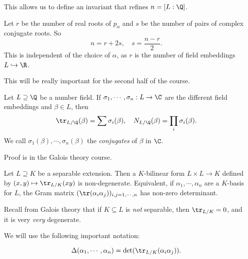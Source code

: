 \documentclass[a4paper]{article}
\begin{document}
This allows us to define an invariant that refines $n = [L:\Q]$.

\begin{defi}[$r$ and $s$]
  Let $r$ be the number of real roots of $p_\alpha$ and $s$ be the number of pairs of complex conjugate roots. So
  \[
    n = r + 2s,\quad s = \frac{n - r}{2}.
  \]
  This is independent of the choice of $\alpha$, as $r$ is the number of field embeddings $L \hookrightarrow \R$.
\end{defi}
This will be really important for the second half of the course.

\begin{cor}
  Let $L \supseteq \Q$ be a number field. If $\sigma_1, \cdots, \sigma_n:L \to \C$ are the different field embeddings and $\beta \in L$, then
  \[
    \tr_{L/\Q}(\beta) = \sum \sigma_i(\beta),\quad N_{L/\Q}(\beta) = \prod_i \sigma_i(\beta).
  \]
  We call $\sigma_1(\beta), \cdots, \sigma_n (\beta)$ the \emph{conjugates} of $\beta$ in $\C$.
\end{cor}
Proof is in the Galois theory course.

\begin{prop}
  Let $L\supseteq K$ be a separable extension. Then a $K$-bilinear form $L \times L \to K$ defined by $(x, y) \mapsto \tr_{L/K}(xy)$ is non-degenerate. Equivalent, if $\alpha_1,\cdots, \alpha_n$ are a $K$-basis for $L$, the Gram matrix $(\tr(\alpha_i\alpha_j))_{i, j = 1, \cdots, n}$ has non-zero determinant.
\end{prop}
Recall from Galois theory that if $K \subseteq L$ is \emph{not} separable, then $\tr_{L/K} = 0$, and it is very \emph{very} degenerate.

We will use the following important notation:
\begin{notation}
  \[
    \Delta(\alpha_1, \cdots, \alpha_n) = \det(\tr_{L/K}(\alpha_i \alpha_j)).
  \]
\end{notation}
\end{document}
